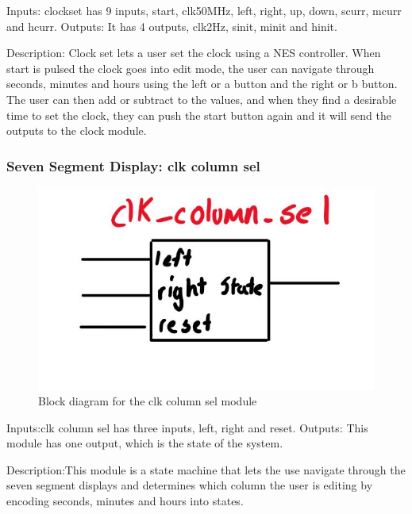 \documentclass[a4paper]{article}
\begin{document}
Inputs: clockset has 9 inputs, start, clk50MHz, left, right, up, down, scurr, mcurr and hcurr.
Outputs: It has 4 outputs, clk2Hz, sinit, minit and hinit.

Description: Clock set lets a user set the clock using a NES controller. When start is pulsed the clock goes into edit mode, the user can navigate through seconds, minutes and hours using the left or a button and the right or b button. The user can then add or subtract to the values, and when they find a desirable time to set the clock, they can push the start button again and it will send the outputs to the clock module.

\subsubsection{Seven Segment Display: clk column sel}
\begin{figure}[H]
    \includegraphics[width=0.8 \linewidth]{images/clkcolumnsel.JPG}
    \caption{Block diagram for the clk column sel module}
    \label{clkcolumnsel}
\end{figure}

Inputs:clk column sel has three inputs, left, right and reset. 
Outputs: This module has one output, which is the state of the system. 

Description:This module is a state machine that lets the use navigate through the seven segment displays and determines which column the user is editing by encoding seconds, minutes and hours into states. 
\end{document}
